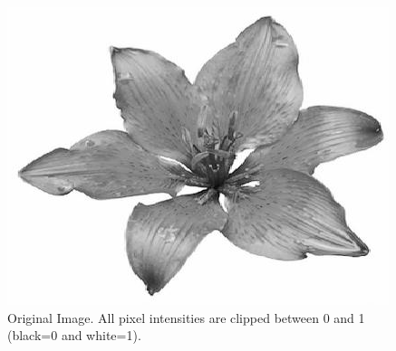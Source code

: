 \begin{figure}[h]
\vspace{-0.2in}
        \centering
	\includegraphics[scale=0.3]{image/white_black.png}
   \vspace{-0.1in}
   \caption{Original Image.  All pixel intensities are clipped between 0 and 1 (black=0 and white=1).}
\label{fig:convolve0}
   \end{figure}
